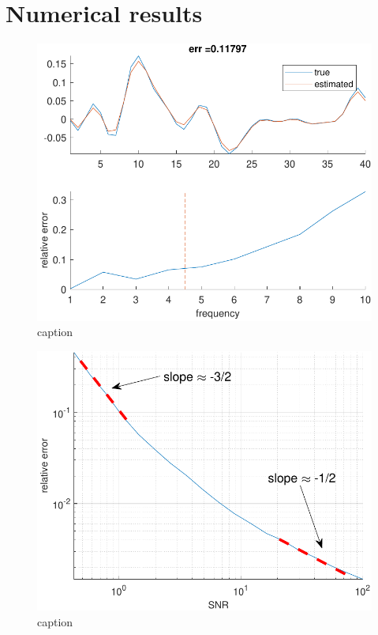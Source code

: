 \documentclass[english,12pt]{article}
\numberwithin{equation}{section}
\numberwithin{thm}{section} %
\begin{document}
\section{Numerical results}

\begin{figure}[h]
	\centering
	\includegraphics[scale=1]{XP2}
	\caption{\label{fig:XP2} caption}	
\end{figure}


\begin{figure}[h]
	\centering
	  \includegraphics[scale=1]{XP1}
	  \caption{\label{fig:XP1} caption}	
\end{figure}
\end{document}
